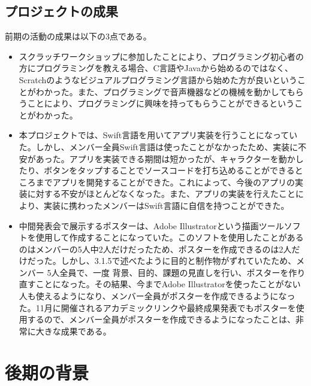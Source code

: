 \documentclass[openany,11pt,papersize]{jsbook}
\begin{document}
\section{プロジェクトの成果}
\par 前期の活動の成果は以下の3点である。
\begin{itemize}
\item スクラッチワークショップに参加したことにより、プログラミング初心者の方にプログラミングを教える場合、C言語やJavaから始めるのではなく、Scratchのようなビジュアルプログラミング言語から始めた方が良いということがわかった。また、プログラミングで音声機器などの機械を動かしてもらうことにより、プログラミングに興味を持ってもらうことができるということがわかった。
\item 
本プロジェクトでは、Swift言語を用いてアプリ実装を行うことになっていた。しかし、メンバー全員Swift言語は使ったことがなかったため、実装に不安があった。アプリを実装できる期間は短かったが、キャラクターを動かしたり、ボタンをタップすることでソースコードを打ち込めることができるところまでアプリを開発することができた。これによって、今後のアプリの実装に対する不安がほとんどなくなった。また、アプリの実装を行えたことにより、実装に携わったメンバーはSwift言語に自信を持つことができた。

\item 中間発表会で展示するポスターは、Adobe Illustratorという描画ツールソフトを使用して作成することになっていた。このソフトを使用したことがあるのはメンバーの5人中2人だけだったため、ポスターを作成できるのは2人だけだった。しかし、3.1.5で述べたように目的と制作物がずれていたため、メンバー 5人全員で、一度 背景、目的、課題の見直しを行い、ポスターを作り直すことになった。その結果、今までAdobe Illustratorを使ったことがない人も使えるようになり、メンバー全員がポスターを作成できるようになった。11月に開催されるアカデミックリンクや最終成果発表でもポスターを使用するので、メンバー全員がポスターを作成できるようになったことは、非常に大きな成果である。
\end{itemize}




\chapter{後期の背景}
\end{document}
